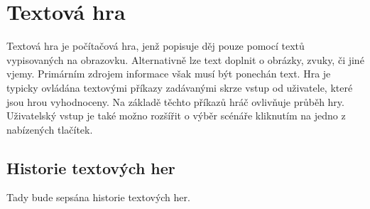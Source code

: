 \documentclass[main.tex]{subfiles}
\begin{document}
\section{Textová hra}
Textová hra je počítačová hra, jenž popisuje děj pouze pomocí textů vypisovaných na obrazovku. Alternativně lze text doplnit o obrázky, zvuky, či jiné vjemy. Primárním zdrojem informace však musí být ponechán text. Hra je typicky ovládána textovými příkazy zadávanými skrze vstup od uživatele, které jsou hrou vyhodnoceny. Na základě těchto příkazů hráč ovlivňuje průběh hry. Uživatelský vstup je také možno rozšířit o výběr scénáře kliknutím na jedno z nabízených tlačítek.

\subsection{Historie textových her}
Tady bude sepsána historie textových her.
\end{document}
